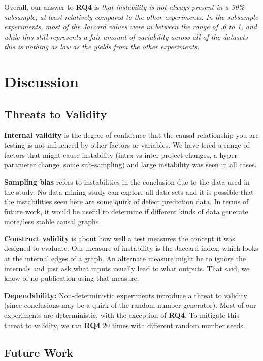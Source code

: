 \documentclass[]{svjour3}
\begin{document}
Overall, our answer to {\bf RQ4} is {\em that instability is not always present in a 90\% subsample, at least relatively compared to the other experiments.  In the subsample experiments, most of the Jaccard values were in between the range of .6 to 1, and while this still represents a fair amount of variability across all of the datasets this is nothing as low as the yields from the other experiments.}

\section{Discussion}\label{discuss}
\subsection{Threats to Validity}


\textbf{Internal validity}  is the degree of confidence that the causal relationship you are testing is not influenced by other factors or variables.
We have tried a range of factors that might cause instability (intra-vs-inter project changes, a hyper-parameter change, some sub-sampling) and large instability was seen in all cases. 
 
\textbf{Sampling bias  } refers to instabilities in the conclusion due to
the data used in the study. No data mining study can explore all data sets
and it is possible that the instabilities seen here are some quirk of defect prediction data. In terms of future work, it would be useful to determine if different kinds of data generate more/less stable causal graphs.

\textbf{Construct validity} 
 is about how well a test measures the concept it was designed to evaluate.
 Our measure of instability is the Jaccard index, which looks at the internal edges of a graph. An alternate measure might be to ignore the internals and just ask what inputs usually lead to what outputs. That said, we know of no publication using that measure.

\textbf{Dependability:} 
Non-deterministic experiments introduce a threat to validity (since   conclusions may   be a quirk of the random number generator). Most of our experiments are deterministic, with the exception of {\bf RQ4}.
To mitigate this threat to validity, we ran {\bf RQ4} 20 times with different random number seeds.

 
\subsection{Future Work}
\end{document}
